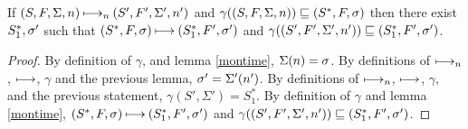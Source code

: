 \documentclass{llncs}
\begin{document}
\begin{theorem}
If $(S,F,\Sigma,n) \mathbin{\longmapsto_n} (S',F',\Sigma',n')$ and
$\gamma((S,F,\Sigma,n)) \sqsubseteq (S^*,F,\sigma)$ then there exist
$S^*_1,\sigma'$ such that $(S^*,F,\sigma) \mathbin{\longmapsto} (S^*_1,F',\sigma')$
and $\gamma((S',F',\Sigma',n')) \sqsubseteq (S^*_1,F',\sigma')$.
\end{theorem}
\begin{proof}
By definition of $\gamma$, and lemma \ref{montime}, $\Sigma(n) = \sigma$.
By definitions of $\mathbin{\longmapsto_n}$, $\mathbin{\longmapsto}$, $\gamma$ and the previous lemma, $\sigma' = \Sigma'(n')$.
By definitions of $\mathbin{\longmapsto_n}$, $\mathbin{\longmapsto}$, $\gamma$, and the previous statement, $\gamma(S',\Sigma') = S^*_1$.
By definition of $\gamma$ and lemma \ref{montime}, $(S^*,F,\sigma) \mathbin{\longmapsto} (S^*_1,F',\sigma')$ and $\gamma((S',F',\Sigma',n')) \sqsubseteq (S^*_1,F',\sigma')$.
\end{proof}
\end{document}
